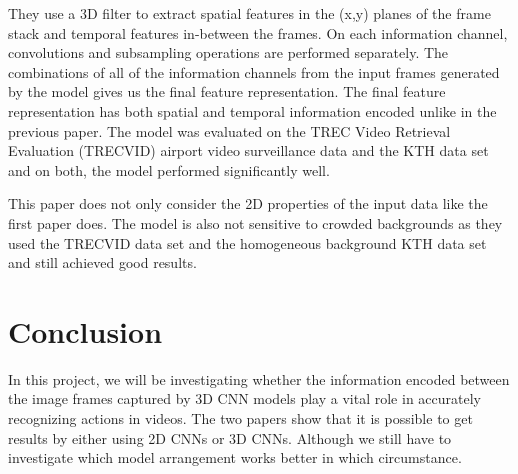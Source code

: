 They use a 3D filter to extract spatial features in the (x,y) planes of the frame stack and temporal features in-between the frames. On each information channel, convolutions and subsampling operations are performed separately. The combinations of all of the information channels from the input frames generated by the model gives us the final feature representation. The final feature representation has both spatial and temporal information encoded unlike in the previous paper. The model was evaluated on the TREC Video Retrieval Evaluation (TRECVID) airport video surveillance data and the KTH data set and on both, the model performed significantly well.\vspace{0.1in}

This paper does not only consider the 2D properties of the input data like the first paper does. The model is also not sensitive to crowded backgrounds as they used the TRECVID data set and the homogeneous background KTH data set and still achieved good results.  



\section{Conclusion}

In this project, we will be investigating whether the information encoded between the image frames captured by 3D CNN models play a vital role in accurately recognizing actions in videos. The two papers show that it is possible to get results by either using 2D CNNs or 3D CNNs. Although we still have to investigate which model arrangement works better in which circumstance. 
 \par
\vspace{0.4in}

  \par

\par

